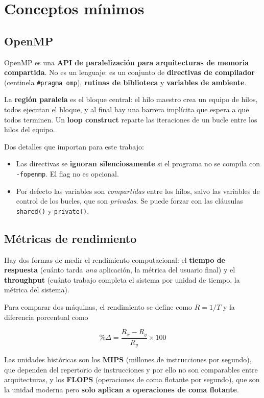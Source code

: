 \section{Conceptos mínimos}

\subsection{OpenMP}

OpenMP es una \textbf{API de paralelización para arquitecturas de memoria compartida}. No es un lenguaje: es un conjunto de \textbf{directivas de compilador} (centinela \texttt{\#pragma omp}), \textbf{rutinas de biblioteca} y \textbf{variables de ambiente}.

La \textbf{región paralela} es el bloque central: el hilo maestro crea un equipo de hilos, todos ejecutan el bloque, y al final hay una barrera implícita que espera a que todos terminen. Un \textbf{loop construct} reparte las iteraciones de un bucle entre los hilos del equipo.

Dos detalles que importan para este trabajo:

\begin{itemize}
    \item Las directivas se \textbf{ignoran silenciosamente} si el programa no se compila con \texttt{-fopenmp}. El flag no es opcional.
    \item Por defecto las variables son \emph{compartidas} entre los hilos, salvo las variables de control de los bucles, que son \emph{privadas}. Se puede forzar con las cláusulas \texttt{shared()} y \texttt{private()}.
\end{itemize}

\subsection{Métricas de rendimiento}

Hay dos formas de medir el rendimiento computacional: el \textbf{tiempo de respuesta} (cuánto tarda \emph{una} aplicación, la métrica del usuario final) y el \textbf{throughput} (cuánto trabajo completa el sistema por unidad de tiempo, la métrica del sistema).

Para comparar dos máquinas, el rendimiento se define como $R = 1/T$ y la diferencia porcentual como

\[
\%\Delta = \frac{R_x - R_y}{R_y} \times 100
\]

Las unidades históricas son los \textbf{MIPS} (millones de instrucciones por segundo), que dependen del repertorio de instrucciones y por ello no son comparables entre arquitecturas, y los \textbf{FLOPS} (operaciones de coma flotante por segundo), que son la unidad moderna pero \textbf{solo aplican a operaciones de coma flotante}.

